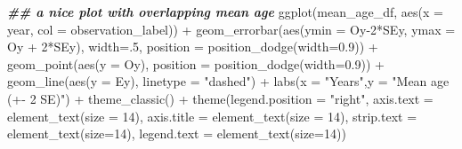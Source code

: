 \documentclass[
]{book}
\newenvironment{Shaded}{\begin{snugshade}}{\end{snugshade}}
\newcommand{\AttributeTok}[1]{\textcolor[rgb]{0.77,0.63,0.00}{#1}}
\newcommand{\DecValTok}[1]{\textcolor[rgb]{0.00,0.00,0.81}{#1}}
\newcommand{\DocumentationTok}[1]{\textcolor[rgb]{0.56,0.35,0.01}{\textbf{\textit{#1}}}}
\newcommand{\FloatTok}[1]{\textcolor[rgb]{0.00,0.00,0.81}{#1}}
\newcommand{\FunctionTok}[1]{\textcolor[rgb]{0.00,0.00,0.00}{#1}}
\newcommand{\NormalTok}[1]{#1}
\newcommand{\SpecialCharTok}[1]{\textcolor[rgb]{0.00,0.00,0.00}{#1}}
\newcommand{\StringTok}[1]{\textcolor[rgb]{0.31,0.60,0.02}{#1}}
\begin{document}
\begin{Shaded}
\begin{Highlighting}[]
\DocumentationTok{\#\# a nice plot with overlapping mean age}
\FunctionTok{ggplot}\NormalTok{(mean\_age\_df, }\FunctionTok{aes}\NormalTok{(}\AttributeTok{x =}\NormalTok{ year, }\AttributeTok{col =}\NormalTok{ observation\_label)) }\SpecialCharTok{+}
  \FunctionTok{geom\_errorbar}\NormalTok{(}\FunctionTok{aes}\NormalTok{(}\AttributeTok{ymin =}\NormalTok{ Oy}\DecValTok{{-}2}\SpecialCharTok{*}\NormalTok{SEy, }\AttributeTok{ymax =}\NormalTok{ Oy }\SpecialCharTok{+} \DecValTok{2}\SpecialCharTok{*}\NormalTok{SEy), }\AttributeTok{width=}\NormalTok{.}\DecValTok{5}\NormalTok{, }
                \AttributeTok{position =} \FunctionTok{position\_dodge}\NormalTok{(}\AttributeTok{width=}\FloatTok{0.9}\NormalTok{)) }\SpecialCharTok{+}
  \FunctionTok{geom\_point}\NormalTok{(}\FunctionTok{aes}\NormalTok{(}\AttributeTok{y =}\NormalTok{ Oy), }\AttributeTok{position =} \FunctionTok{position\_dodge}\NormalTok{(}\AttributeTok{width=}\FloatTok{0.9}\NormalTok{)) }\SpecialCharTok{+}
  \FunctionTok{geom\_line}\NormalTok{(}\FunctionTok{aes}\NormalTok{(}\AttributeTok{y =}\NormalTok{ Ey), }\AttributeTok{linetype =} \StringTok{"dashed"}\NormalTok{) }\SpecialCharTok{+}
  \FunctionTok{labs}\NormalTok{(}\AttributeTok{x =} \StringTok{"Years"}\NormalTok{,}\AttributeTok{y =} \StringTok{"Mean age (+{-} 2 SE)"}\NormalTok{) }\SpecialCharTok{+}
  \FunctionTok{theme\_classic}\NormalTok{() }\SpecialCharTok{+}
  \FunctionTok{theme}\NormalTok{(}\AttributeTok{legend.position =} \StringTok{"right"}\NormalTok{, }
        \AttributeTok{axis.text =} \FunctionTok{element\_text}\NormalTok{(}\AttributeTok{size =} \DecValTok{14}\NormalTok{), }
        \AttributeTok{axis.title =} \FunctionTok{element\_text}\NormalTok{(}\AttributeTok{size =} \DecValTok{14}\NormalTok{),}
        \AttributeTok{strip.text =} \FunctionTok{element\_text}\NormalTok{(}\AttributeTok{size=}\DecValTok{14}\NormalTok{),}
        \AttributeTok{legend.text =} \FunctionTok{element\_text}\NormalTok{(}\AttributeTok{size=}\DecValTok{14}\NormalTok{))}
\end{Highlighting}
\end{Shaded}
\end{document}
